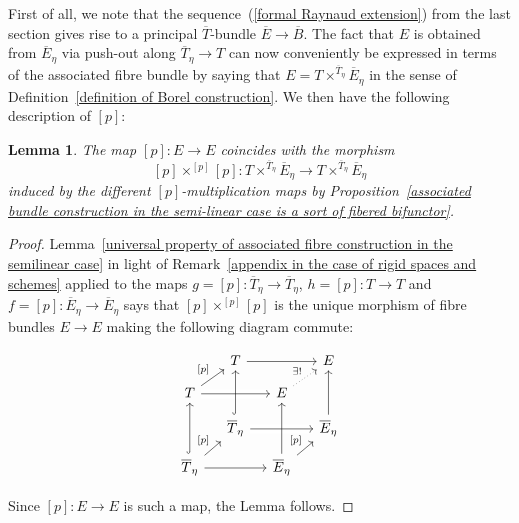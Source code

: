 \documentclass[10pt,oneside]{amsart}
\newtheorem{lemma}[theorem]{Lemma}
\theoremstyle{definition}
\begin{document}
	First of all, we note that the sequence~(\ref{formal Raynaud extension}) from the last section gives rise to a principal $\overline{T}$-bundle
	$\overline{E}\rightarrow \overline{B}$. The fact that $E$ is obtained from $\overline{E}_\eta$ via push-out along $\overline{T}_\eta\rightarrow T$ can now conveniently be expressed in terms of the associated fibre bundle by saying that $E = T\times^{\overline{T}_\eta}\overline{E}_\eta$ in the sense of Definition~\ref{definition of Borel construction}. We then have the following description of $[p]$:
	\begin{lemma}\label{p-multiplication is induced from Borel construction}
		The map $[p]:E\rightarrow E$ coincides with the morphism 
		\[[p]\times^{[p]}[p]: T\times^{\overline{T}_\eta}\overline{E}_\eta\rightarrow T\times^{\overline{T}_\eta}\overline{E}_\eta\]
		induced by the different $[p]$-multiplication maps by Proposition~\ref{associated bundle construction in the semi-linear case is a sort of fibered bifunctor}.
	\end{lemma}
	\begin{proof}
		Lemma~\ref{universal property of associated fibre construction in the semilinear case} in light of Remark~\ref{appendix in the case of rigid spaces and schemes} applied to the maps $g=[p]:\overline{T}_\eta\rightarrow \overline{T}_\eta$, $h=[p]:T\rightarrow T$ and $f=[p]:\overline{E}_\eta\rightarrow \overline{E}_\eta$ says that $[p]\times^{[p]}[p]$ is the unique morphism of fibre bundles $E\rightarrow E$ making the following diagram commute:
		\begin{center}
			\begin{equation}\label{rigid p-multiplication cube}
			\begin{tikzcd}[row sep = small, column sep = small]
				& T \arrow[rr] &  & E \\
				T \arrow[ru, "{[p]}"] \arrow[rr,crossing over] &  & E \arrow[ru, "\exists!", dotted] &  \\
				& \overline{T}_\eta \arrow[uu, hook] \arrow[rr,crossing over] &  & \overline{E}_\eta \arrow[uu] \\
				\overline{T}_\eta \arrow[ru, "{[p]}"] \arrow[uu, hook] \arrow[rr] &  & \overline{E}_\eta \arrow[ru, "{[p]}"] \arrow[uu] & 
			\end{tikzcd}
			\end{equation}
		\end{center}
		Since $[p]:E\rightarrow E$ is such a map, the Lemma follows.
	\end{proof}
\end{document}
